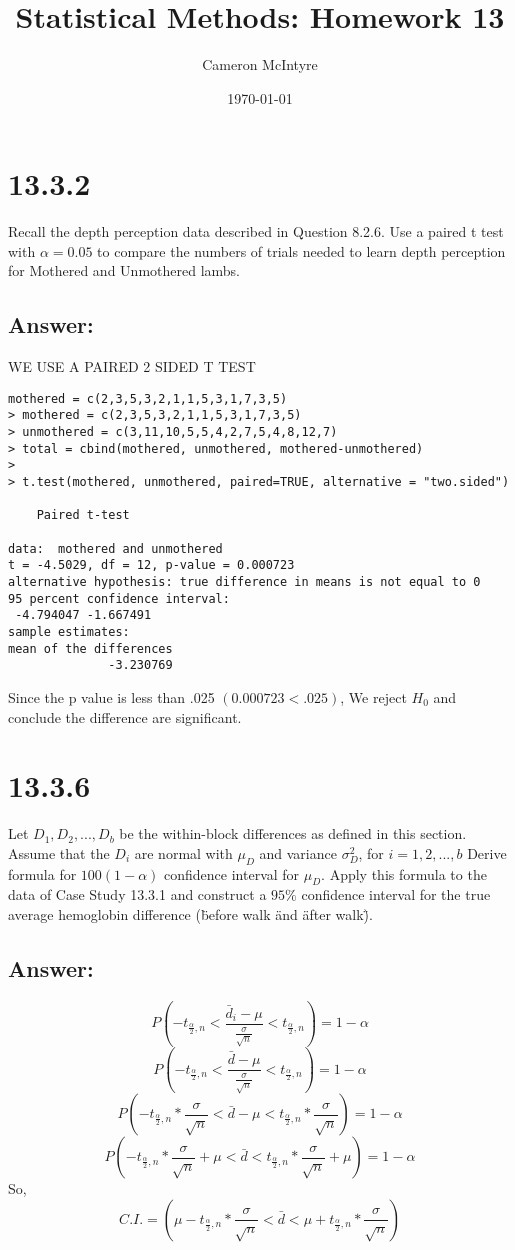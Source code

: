 \documentclass[svgnames]{article}
\title{Statistical Methods: Homework 13}
\author{Cameron McIntyre}
\date{\today}
\begin{document}
\maketitle

\section{13.3.2}
 Recall the depth perception data described in Question 8.2.6. Use a paired t test with $\alpha = 0.05$ to compare the numbers of trials needed to learn depth perception for Mothered and Unmothered lambs.

\subsection*{Answer:}

WE USE A PAIRED 2 SIDED T TEST

\begin{lstlisting}
mothered = c(2,3,5,3,2,1,1,5,3,1,7,3,5)
> mothered = c(2,3,5,3,2,1,1,5,3,1,7,3,5)
> unmothered = c(3,11,10,5,5,4,2,7,5,4,8,12,7)
> total = cbind(mothered, unmothered, mothered-unmothered)
> 
> t.test(mothered, unmothered, paired=TRUE, alternative = "two.sided")

	Paired t-test

data:  mothered and unmothered
t = -4.5029, df = 12, p-value = 0.000723
alternative hypothesis: true difference in means is not equal to 0
95 percent confidence interval:
 -4.794047 -1.667491
sample estimates:
mean of the differences 
              -3.230769 
\end{lstlisting}

Since the p value is less than .025 $(0.000723<.025)$, We reject $H_0$ and conclude the difference are significant.

\section{13.3.6}
Let $D_1, D_2, ..., D_b$ be the within-block differences as defined in this section. 
Assume that the $D_i$ are normal with $\mu_D$ and variance $\sigma_D^2$, for $i = 1, 2,..., b$ 
Derive formula for $100(1-\alpha)$ confidence interval for $\mu_D$. 
Apply this formula to the data of Case Study 13.3.1 and construct 
a $95\%$ confidence interval for the true average hemoglobin difference (\" before walk \" and  \" after walk\").


\subsection*{Answer:}
$$P(-t_{\frac{\alpha}{2},n}<\frac{\bar{d}_i-\mu}{\frac{\sigma}{\sqrt{n}}}<t_{\frac{\alpha}{2},n})=1-\alpha$$
$$P(-t_{\frac{\alpha}{2},n}<\frac{\bar{d}-\mu}{\frac{\sigma}{\sqrt{n}}}<t_{\frac{\alpha}{2},n})=1-\alpha$$
$$P(-t_{\frac{\alpha}{2},n}*\frac{\sigma}{\sqrt{n}}<\bar{d}-\mu<t_{\frac{\alpha}{2},n}*\frac{\sigma}{\sqrt{n}})=1-\alpha$$
$$P(-t_{\frac{\alpha}{2},n}*\frac{\sigma}{\sqrt{n}}+\mu<\bar{d}<t_{\frac{\alpha}{2},n}*\frac{\sigma}{\sqrt{n}}+\mu)=1-\alpha$$
So,
$$C.I. = (\mu-t_{\frac{\alpha}{2},n}*\frac{\sigma}{\sqrt{n}}<\bar{d}<\mu+t_{\frac{\alpha}{2},n}*\frac{\sigma}{\sqrt{n}})$$
\end{document}
